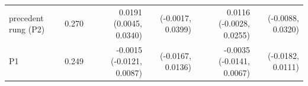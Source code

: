 \begin{tabular}{lrrrrr}
precedent rung (P2) & 0.270 & 0.0191 (0.0045, 0.0340) & (-0.0017, 0.0399) & 0.0116 (-0.0028, 0.0255) & (-0.0088, 0.0320) \\
P1 & 0.249 & -0.0015 (-0.0121, 0.0087) & (-0.0167, 0.0136) & -0.0035 (-0.0141, 0.0067) & (-0.0182, 0.0111) \\

\end{tabular}

